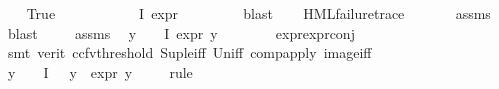 \begin{isabellebody}
\ \ \isamarkupfalse%
\ True\isanewline
\ \ \isamarkupfalse%
\ \isamarkupfalse%
\ {\isasympsi}\ \ {\isachardoublequoteopen}{\isasympsi}\ {\isasymin}\ {\isasymPhi}\ {\isacharbackquote}{\kern0pt}\ I{\isachardoublequoteclose}\ {\isachardoublequoteopen}expr{\isacharunderscore}{\kern0pt}{}\ {\isasympsi}\ {\isasymge}\ {}{\isachardoublequoteclose}\isanewline
\ \ \ \ \isamarkupfalse%
\ blast\isanewline
\ \ \isamarkupfalse%
\ {\isachardoublequoteopen}HML{\isacharunderscore}{\kern0pt}failure{\isacharunderscore}{\kern0pt}trace\ {\isasympsi}{\isachardoublequoteclose}\isanewline
\ \ \ \ \isamarkupfalse%
\ assms{\isacharparenleft}{\kern0pt}{}{\isacharparenright}{\kern0pt}\ \isamarkupfalse%
\ blast\ \isanewline
\ \ \isamarkupfalse%
\ assms{\isacharparenleft}{\kern0pt}{}{\isacharparenright}{\kern0pt}\ \isamarkupfalse%
\ {\isachardoublequoteopen}{\isacharparenleft}{\kern0pt}{\isasymforall}y\ {\isasymin}\ {\isacharparenleft}{\kern0pt}{\isasymPhi}\ {\isacharbackquote}{\kern0pt}\ I{\isacharparenright}{\kern0pt}{\isachardot}{\kern0pt}\ expr{\isacharunderscore}{\kern0pt}{}\ y\ {\isasymle}\ {}{\isacharparenright}{\kern0pt}{\isachardoublequoteclose}\isanewline
\ \ \ \ \isamarkupfalse%
\ expr{\isacharunderscore}{\kern0pt}{}{\isachardot}{\kern0pt}expr{\isacharunderscore}{\kern0pt}{}{\isacharunderscore}{\kern0pt}conj\ \isanewline
\ \ \ \ \isamarkupfalse%
\ {\isacharparenleft}{\kern0pt}smt\ {\isacharparenleft}{\kern0pt}verit{\isacharcomma}{\kern0pt}\ ccfv{\isacharunderscore}{\kern0pt}threshold{\isacharparenright}{\kern0pt}\ Sup{\isacharunderscore}{\kern0pt}le{\isacharunderscore}{\kern0pt}iff\ Un{\isacharunderscore}{\kern0pt}iff\ comp{\isacharunderscore}{\kern0pt}apply\ image{\isacharunderscore}{\kern0pt}iff{\isacharparenright}{\kern0pt}\isanewline
\ \ \isamarkupfalse%
\ {\isachardoublequoteopen}{\isacharparenleft}{\kern0pt}{\isasymforall}y\ {\isasymin}\ {\isacharparenleft}{\kern0pt}{\isasymPhi}\ {\isacharbackquote}{\kern0pt}\ I{\isacharparenright}{\kern0pt}{\isachardot}{\kern0pt}\ {\isasympsi}\ {\isasymnoteq}\ y\ {\isasymlongrightarrow}\ expr{\isacharunderscore}{\kern0pt}{}\ y\ {\isasymle}\ {}{\isacharparenright}{\kern0pt}{\isachardoublequoteclose}\isanewline
\ \ \isamarkupfalse%
{\isacharparenleft}{\kern0pt}rule{\isacharplus}{\kern0pt}{\isacharparenright}{\kern0pt}\isanewline

\end{isabellebody}
